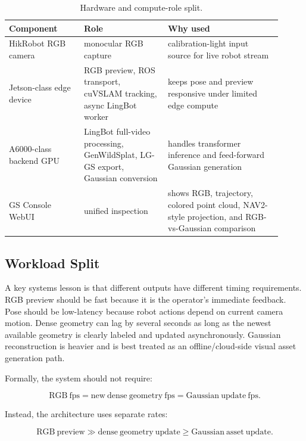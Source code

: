 \documentclass[11pt]{article}
\newcommand{\methodabbr}{LG-GS}
\newcommand{\RouteB}{\methodabbr\xspace}
\begin{document}
\begin{table}[H]
\centering
\caption{Hardware and compute-role split.}
\label{tab:hardware}
\begin{tabular}{@{}p{0.25\linewidth}p{0.28\linewidth}p{0.38\linewidth}@{}}
\toprule
\textbf{Component} & \textbf{Role} & \textbf{Why used} \\
\midrule
HikRobot RGB camera & monocular RGB capture & calibration-light input source for live robot stream \\
Jetson-class edge device & RGB preview, ROS transport, cuVSLAM tracking, async LingBot worker & keeps pose and preview responsive under limited edge compute \\
A6000-class backend GPU & LingBot full-video processing, GenWildSplat, \RouteB export, Gaussian conversion & handles transformer inference and feed-forward Gaussian generation \\
GS Console WebUI & unified inspection & shows RGB, trajectory, colored point cloud, NAV2-style projection, and RGB-vs-Gaussian comparison \\
\bottomrule
\end{tabular}
\end{table}

\subsection{Workload Split}

A key systems lesson is that different outputs have different timing requirements. RGB preview should be fast because it is the operator's immediate feedback. Pose should be low-latency because robot actions depend on current camera motion. Dense geometry can lag by several seconds as long as the newest available geometry is clearly labeled and updated asynchronously. Gaussian reconstruction is heavier and is best treated as an offline/cloud-side visual asset generation path.

Formally, the system should not require:

\begin{equation}
\mathrm{RGB\ fps} = \mathrm{new\ dense\ geometry\ fps} = \mathrm{Gaussian\ update\ fps}.
\end{equation}

Instead, the architecture uses separate rates:

\begin{equation}
\mathrm{RGB\ preview} \gg \mathrm{dense\ geometry\ update} \geq \mathrm{Gaussian\ asset\ update}.
\end{equation}
\end{document}
